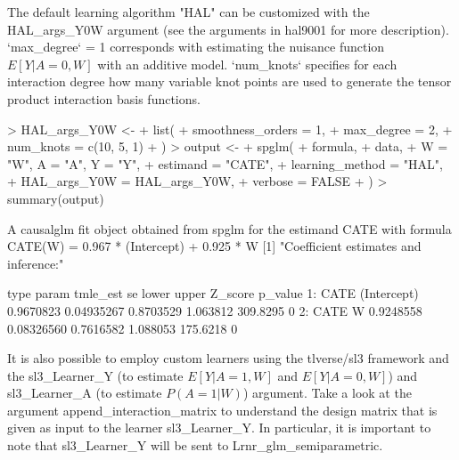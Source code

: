 \documentclass[article]{jss}
\begin{document}
The default learning algorithm "HAL" can be customized with the HAL\_args\_Y0W argument (see the arguments in hal9001 for more description). `max\_degree` = 1 corresponds with estimating the nuisance function $E[Y|A=0,W]$ with an additive model. `num\_knots` specifies for each interaction degree how many variable knot points are used to generate the tensor product interaction basis functions. 

\begin{Schunk}
\begin{Sinput}
> HAL_args_Y0W <-
+   list(
+     smoothness_orders = 1,
+     max_degree = 2,
+     num_knots = c(10, 5, 1)
+   )
> output <-
+   spglm(
+     formula,
+     data,
+     W = "W", A = "A", Y = "Y",
+     estimand = "CATE",
+     learning_method = "HAL",
+     HAL_args_Y0W = HAL_args_Y0W,
+     verbose = FALSE
+   )
> summary(output)
\end{Sinput}
\begin{Soutput}
A causalglm fit object obtained from spglm for the estimand CATE with formula 
CATE(W) = 0.967 * (Intercept) + 0.925 * W
[1] "Coefficient estimates and inference:"

   type       param  tmle_est         se     lower    upper  Z_score p_value
1: CATE (Intercept) 0.9670823 0.04935267 0.8703529 1.063812 309.8295       0
2: CATE           W 0.9248558 0.08326560 0.7616582 1.088053 175.6218       0
\end{Soutput}
\end{Schunk}

It is also possible to employ custom learners using the tlverse/sl3 framework and the sl3\_Learner\_Y (to estimate $E[Y|A=1,W]$ and $E[Y|A=0,W]$) and sl3\_Learner\_A (to estimate $P(A=1|W)$) argument.
Take a look at the argument append\_interaction\_matrix to understand the design matrix that is given as input to the learner sl3\_Learner\_Y. In particular, it is important to note that sl3\_Learner\_Y will be sent to Lrnr\_glm\_semiparametric.
\end{document}
